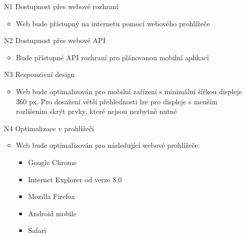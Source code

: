 \begin{itemize}
    \item[N1] Dostupnost přes webové rozhraní
        \begin{itemize}
            \item Web bude přístupný na internetu pomocí webového prohlížeče
        \end{itemize}
    \item[N2] Dostupnost přes webové API
        \begin{itemize}
            \item Bude přístupné API rozhraní pro plánovanou mobilní aplikaci
        \end{itemize}
    \item[N3] Responzivní design
        \begin{itemize}
            \item Web bude optimalizován pro mobilní zařízení s minimální šířkou displeje 360 px. Pro dosažení větší přehlednosti lze pro displeje s menším rozlišením skrýt prvky, které nejsou nezbytně nutné
        \end{itemize}
    \item[N4] Optimalizace v prohlížeči
        \begin{itemize}
            \item Web bude optimalizován pro následující webové prohlížeče:
                \begin{itemize}
                    \item Google Chrome
                    \item Internet Explorer od verze 8.0
                    \item Mozilla Firefox
                    \item Android mobile
                    \item Safari
                \end{itemize}
        \end{itemize}
\end{itemize}